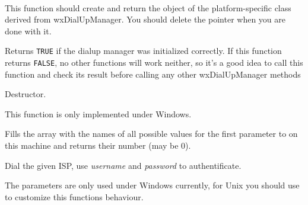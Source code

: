 
\\


\label{wxdialupmanagercreate}


This function should create and return the object of the platform-specific
class derived from wxDialUpManager. You should delete the pointer when you are
done with it.

\label{wxdialupmanagerisok}


Returns {\tt TRUE} if the dialup manager was initialized correctly. If this
function returns {\tt FALSE}, no other functions will work neither, so it's a
good idea to call this function and check its result before calling any other
wxDialUpManager methods

\label{wxdialupmanagerdtor}


Destructor.

\label{wxdialupmanagergetispnames}


This function is only implemented under Windows.

Fills the array with the names of all possible values for the first
parameter to  on this machine and returns
their number (may be $0$).

\label{wxdialupmanagerdial}


Dial the given ISP, use {\it username} and {\it password} to authentificate.

The parameters are only used under Windows currently, for Unix you should use 
 to customize this
functions behaviour.


